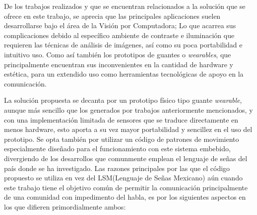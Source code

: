 \hfill \break
\justifying
De los trabajos realizados y que se encuentran relacionados a la solución que se ofrece en este trabajo, se aprecia que las principales aplicaciones suelen desarrollarse bajo el área de la Visión por Computadora; Lo que acarrea sus complicaciones debido al específico ambiente de contraste e iluminación que requieren las técnicas de análisis de imágenes, así como su poca portabilidad e intuitivo uso. Como así también los prototipos de guantes o \textit{wearables}, que principalmente encuentran sus inconvenientes en la cantidad de hardware y estética, para un extendido uso como herramientas tecnológicas de apoyo en la comunicación.

\hfill \break
\justifying
La solución propuesta se decanta por un prototipo físico tipo guante \textit{wearable}, aunque más sencillo que los generados por trabajos anteriormente mencionados, y con una implementación limitada de sensores que se traduce directamente en menos hardware, esto aporta a su vez mayor portabilidad y sencillez en el uso del prototipo. Se opta también por utilizar un código de patrones de movimiento especialmente diseñado para el funcionamiento con este sistema embebido, divergiendo de los desarrollos que comunmente emplean el lenguaje de señas del país donde se ha investigado.
Las razones principales por las que el código propuesto se utiliza en vez del LSM(Lenguaje de Señas Mexicano) aún cuando este trabajo tiene el objetivo común de permitir la comunicación principalmente de una comunidad con impedimento del habla, es por los siguientes aspectos en los que difieren primordialmente ambos:

